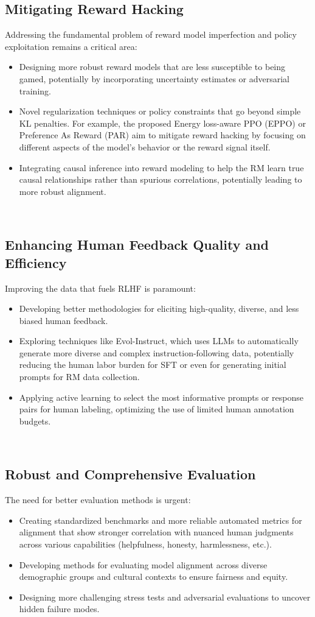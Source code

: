 \documentclass[10pt,journal,compsoc]{IEEEtran} %
\begin{document}
\subsection{Mitigating Reward Hacking}
Addressing the fundamental problem of reward model imperfection and policy exploitation remains a critical area:
\begin{itemize}
\item Designing more robust reward models that are less susceptible to being gamed, potentially by incorporating uncertainty estimates or adversarial training.
\item Novel regularization techniques or policy constraints that go beyond simple KL penalties. For example, the proposed Energy loss-aware PPO (EPPO) or Preference As Reward (PAR) aim to mitigate reward hacking by focusing on different aspects of the model's behavior or the reward signal itself.
\item Integrating causal inference into reward modeling to help the RM learn true causal relationships rather than spurious correlations, potentially leading to more robust alignment.
\end{itemize}  

\subsection{Enhancing Human Feedback Quality and Efficiency}
Improving the data that fuels RLHF is paramount:
\begin{itemize}
\item Developing better methodologies for eliciting high-quality, diverse, and less biased human feedback.
\item Exploring techniques like Evol-Instruct, which uses LLMs to automatically generate more diverse and complex instruction-following data, potentially reducing the human labor burden for SFT or even for generating initial prompts for RM data collection.
\item Applying active learning to select the most informative prompts or response pairs for human labeling, optimizing the use of limited human annotation budgets.
\end{itemize}  

\subsection{Robust and Comprehensive Evaluation}
The need for better evaluation methods is urgent:
\begin{itemize}
\item Creating standardized benchmarks and more reliable automated metrics for alignment that show stronger correlation with nuanced human judgments across various capabilities (helpfulness, honesty, harmlessness, etc.).
\item Developing methods for evaluating model alignment across diverse demographic groups and cultural contexts to ensure fairness and equity.
\item Designing more challenging stress tests and adversarial evaluations to uncover hidden failure modes.
\end{itemize}  
\end{document}
